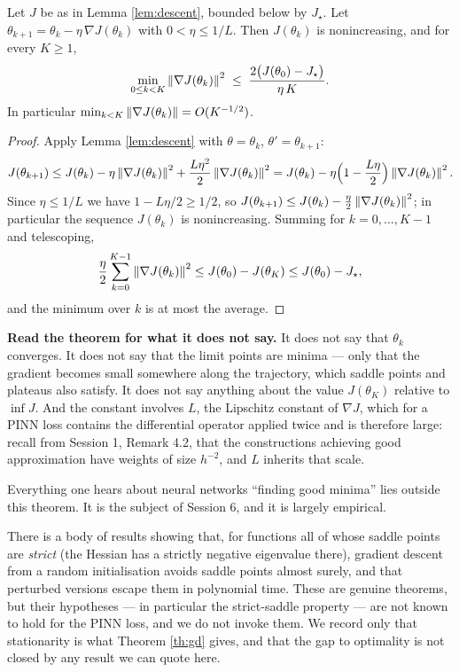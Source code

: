 \documentclass[11pt,a4paper]{article}
\begin{document}
\begin{theorem}\label{th:gd}
Let $J$ be as in Lemma \ref{lem:descent}, bounded below by $J_\star$. Let
$\theta_{k+1} = \theta_k - \eta\,\nabla J(\theta_k)$ with $0 < \eta \le 1/L$. Then $J(\theta_k)$ is
nonincreasing, and for every $K \ge 1$,
\[
\min_{0 \le k < K} \left\lVert \nabla J(\theta_k) \right\rVert^2 \;\le\; \frac{2\big(J(\theta_0) - J_\star\big)}{\eta\, K} .
\]
In particular $\min_{k<K}\left\lVert \nabla J(\theta_k) \right\rVert = O(K^{-1/2})$.
\end{theorem}

\begin{proof}
Apply Lemma \ref{lem:descent} with $\theta = \theta_k$, $\theta' = \theta_{k+1}$:
\[
J(\theta_{k+1}) \le J(\theta_k) - \eta\left\lVert \nabla J(\theta_k) \right\rVert^2 + \frac{L\eta^2}{2}\left\lVert \nabla J(\theta_k) \right\rVert^2
= J(\theta_k) - \eta\Big(1 - \frac{L\eta}{2}\Big)\left\lVert \nabla J(\theta_k) \right\rVert^2 .
\]
Since $\eta \le 1/L$ we have $1 - L\eta/2 \ge 1/2$, so
$J(\theta_{k+1}) \le J(\theta_k) - \tfrac{\eta}{2}\left\lVert \nabla J(\theta_k) \right\rVert^2$; in particular the
sequence $J(\theta_k)$ is nonincreasing. Summing for $k = 0,\dots,K-1$ and telescoping,
\[
\frac{\eta}{2}\sum_{k=0}^{K-1}\left\lVert \nabla J(\theta_k) \right\rVert^2 \le J(\theta_0) - J(\theta_K) \le J(\theta_0) - J_\star ,
\]
and the minimum over $k$ is at most the average.
\end{proof}

\begin{keyboxwine}
\textbf{Read the theorem for what it does not say.} It does not say that $\theta_k$ converges. It
does not say that the limit points are minima --- only that the gradient becomes small somewhere
along the trajectory, which saddle points and plateaus also satisfy. It does not say anything about
the value $J(\theta_K)$ relative to $\inf J$. And the constant involves $L$, the Lipschitz constant
of $\nabla J$, which for a PINN loss contains the differential operator applied twice and is
therefore large: recall from Session 1, Remark 4.2, that the constructions achieving good
approximation have weights of size $h^{-2}$, and $L$ inherits that scale.

\smallskip
Everything one hears about neural networks ``finding good minima'' lies outside this theorem. It is
the subject of Session 6, and it is largely empirical.
\end{keyboxwine}

\begin{remark}
There is a body of results showing that, for functions all of whose saddle points are \emph{strict}
(the Hessian has a strictly negative eigenvalue there), gradient descent from a random
initialisation avoids saddle points almost surely, and that perturbed versions escape them in
polynomial time. These are genuine theorems, but their hypotheses --- in particular the strict-saddle
property --- are not known to hold for the PINN loss, and we do not invoke them. We record only
that stationarity is what Theorem \ref{th:gd} gives, and that the gap to optimality is not closed by
any result we can quote here.
\end{remark}
\end{document}
